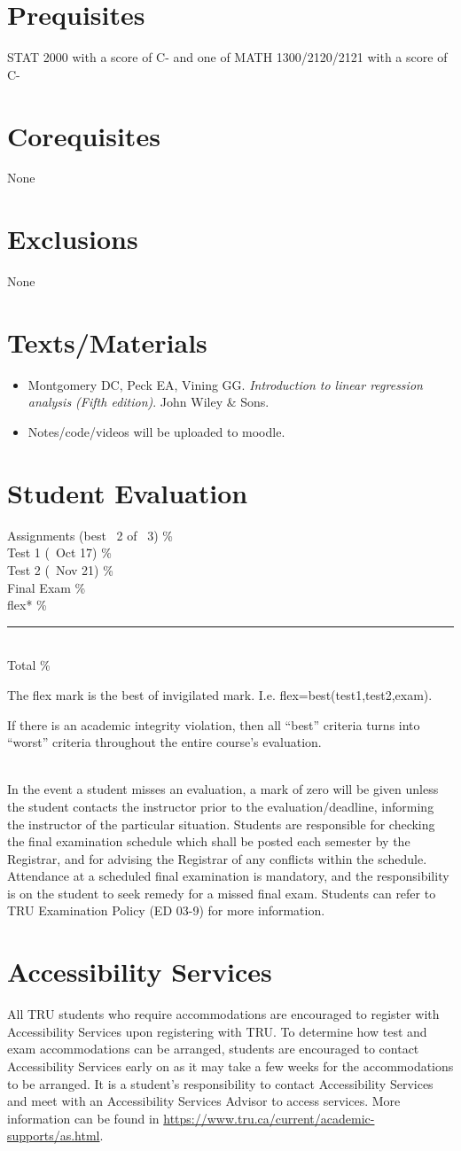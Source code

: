 \documentclass[10pt]{trumathoutline}
\newcommand{\courseprerequisites}{STAT 2000  with a score of C- and one of MATH 1300/2120/2121 with a score of C-}
\newcommand{\coursecorequisites}{None}
\newcommand{\courseexclusions}{None}
\newcommand{\textsmaterials}{
	\begin{itemize}
		\item Montgomery DC, Peck EA, Vining GG. \emph{Introduction to linear regression analysis (Fifth edition)}. John Wiley \& Sons.
		\item Notes/code/videos will be uploaded to moodle. 
	\end{itemize}
}
\newcommand{\evaluation}{
	Assignments (best ~2 of ~3)		\dotfill	20\%\\
	Test 1 (~Oct 17) 				\dotfill	15\%\\
	Test 2 (~Nov 21) 				\dotfill 	15\%\\
	Final Exam 						\dotfill	40\%\\
	flex* 							\dotfill 	10\%\\
	\hrule~\\
	Total 							\dotfill 	100\%
	
	\hfill{\footnotesize *The flex mark is the best of invigilated mark. I.e. flex=best(test1,test2,exam).}
	
	If there is an academic integrity violation, then all “best” criteria turns into “worst” criteria throughout the entire course’s evaluation.
}
\begin{document}
\section*{Prequisites}
\courseprerequisites

\section*{Corequisites}
\coursecorequisites

\section*{Exclusions}
\courseexclusions

\section*{Texts/Materials}
\textsmaterials

\section*{Student Evaluation}
\begin{minipage}{\textwidth}
\evaluation
\end{minipage}\\


In the event a student misses an evaluation, a mark of zero will be given unless the student contacts the instructor prior to the evaluation/deadline, informing the instructor of the particular situation. Students are responsible for checking the final examination schedule which shall be posted each semester by the Registrar, and for advising the Registrar of any conflicts within the schedule. Attendance at a scheduled final examination is mandatory, and the responsibility is on the student to seek remedy for a missed final exam. Students can refer to TRU Examination Policy (ED 03-9) for more information.


\section*{Accessibility Services}
All TRU students who require accommodations are encouraged to register with Accessibility Services upon registering with TRU. To determine how test and exam accommodations can be arranged, students are encouraged to contact Accessibility Services early on as it may take a few weeks for the accommodations to be arranged. It is a student's responsibility to contact Accessibility Services and meet with an Accessibility Services Advisor to access services. More information can be found in
\href{https://www.tru.ca/current/academic-supports/as.html}{https://www.tru.ca/current/academic-supports/as.html}.
\end{document}
